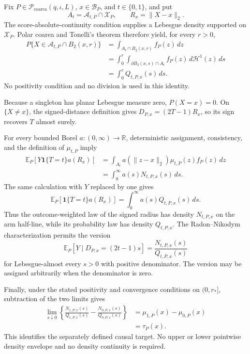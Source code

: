 Fix \(P\in\mathcal P_{\mathrm{coarea}}(q,\iota,L)\), \(x\in\mathcal B_P\), and \(t\in\{0,1\}\), and put
\[
 A_t=\mathcal A_{t,P}\cap\mathcal X_P,
 \qquad R_x=\lVert X-x\rVert_2.
\]
The score-absolute-continuity condition supplies a Lebesgue density supported on \(\mathcal X_P\).  Polar coarea and Tonelli's theorem therefore yield, for every \(r>0\),
\[
\begin{aligned}
 P\{X\in\mathcal A_{t,P}\cap B_2(x,r)\}
 &=\int_{A_t\cap B_2(x,r)}f_P(z)\,dz\\
 &=\int_0^r\int_{\partial B_2(x,s)\cap A_t}
 f_P(z)\,d\mathcal H^1(z)\,ds\\
 &=\int_0^rQ_{t,P,x}(s)\,ds.
\end{aligned}
\]
No positivity condition and no division is used in this identity.

Because a singleton has planar Lebesgue measure zero, \(P(X=x)=0\).  On \(\{X\neq x\}\), the signed-distance definition gives \(D_{P,x}=(2T-1)R_x\), so its sign recovers \(T\) almost surely.

For every bounded Borel \(a:(0,\infty)\to\mathbb R\), deterministic assignment, consistency, and the definition of \(\mu_{t,P}\) imply
\[
\begin{aligned}
 \mathbb E_P[Y\mathbf1\{T=t\}a(R_x)]
 &=\int_{A_t}a(\lVert z-x\rVert_2)\mu_{t,P}(z)f_P(z)\,dz\\
 &=\int_0^\infty a(s)N_{t,P,x}(s)\,ds.
\end{aligned}
\]
The same calculation with \(Y\) replaced by one gives
\[
 \mathbb E_P[\mathbf1\{T=t\}a(R_x)]
 =\int_0^\infty a(s)Q_{t,P,x}(s)\,ds.
\]
Thus the outcome-weighted law of the signed radius has density \(N_{t,P,x}\) on the arm half-line, while its probability law has density \(Q_{t,P,x}\).  The Radon--Nikodym characterization permits the version
\[
 \mathbb E_P[Y\mid D_{P,x}=(2t-1)s]
 =\frac{N_{t,P,x}(s)}{Q_{t,P,x}(s)}
\]
for Lebesgue-almost every \(s>0\) with positive denominator.  The version may be assigned arbitrarily when the denominator is zero.

Finally, under the stated positivity and convergence conditions on \((0,r_*]\), subtraction of the two limits gives
\[
\begin{aligned}
 \lim_{s\downarrow0}\left\{
 \frac{N_{1,P,x}(s)}{Q_{1,P,x}(s)}-
 \frac{N_{0,P,x}(s)}{Q_{0,P,x}(s)}\right\}
 &=\mu_{1,P}(x)-\mu_{0,P}(x)\\
 &=\tau_P(x).
\end{aligned}
\]
This identifies the separately defined causal target.  No upper or lower pointwise density envelope and no density continuity is required.